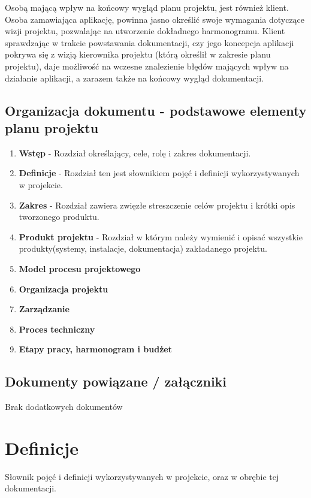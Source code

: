 \documentclass[12pt,a4paper]{article}
\begin{document}
Osobą mającą wpływ na końcowy wygląd planu projektu, jest również klient. Osoba zamawiająca aplikację, powinna jasno określić swoje wymagania dotyczące wizji projektu, pozwalając na utworzenie dokładnego harmonogramu. Klient sprawdzając w trakcie powstawania dokumentacji, czy jego koncepcja aplikacji pokrywa się z wizją kierownika projektu (którą określił w zakresie planu projektu), daje możliwość na wczesne znalezienie błędów mających wpływ na działanie aplikacji, a zarazem także na końcowy wygląd dokumentacji. 

\subsection{Organizacja dokumentu - podstawowe elementy planu projektu}

\begin{enumerate}
    \item \textbf{Wstęp} - Rozdział określający, cele, rolę i zakres dokumentacji.
    \item \textbf{Definicje} - Rozdział ten jest słownikiem pojęć i definicji wykorzystywanych w projekcie.
    \item \textbf{Zakres} - Rozdział zawiera zwięzłe streszczenie celów projektu i krótki opis tworzonego produktu.
    \item \textbf{Produkt projektu} - Rozdział w którym należy wymienić i opisać wszystkie produkty(systemy, instalacje, dokumentacja) zakładanego projektu.
    \item \textbf{Model procesu projektowego}
    \item \textbf{Organizacja projektu}
    \item \textbf{Zarządzanie}
    \item \textbf{Proces techniczny}
    \item \textbf{Etapy pracy, harmonogram i budżet}
\end{enumerate}

\subsection{Dokumenty powiązane / załączniki}
Brak dodatkowych dokumentów

\newpage

\section{Definicje}

Słownik pojęć i definicji wykorzystywanych w projekcie, oraz w obrębie tej dokumentacji. 
\end{document}

